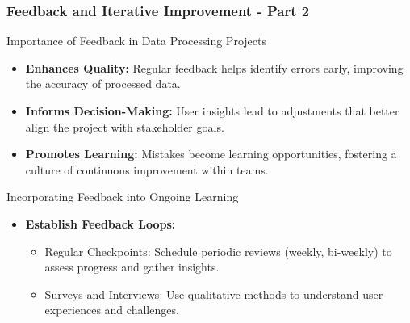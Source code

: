 \documentclass{beamer}
\begin{document}
\begin{frame}[fragile]
    \frametitle{Feedback and Iterative Improvement - Part 2}
    \begin{block}{Importance of Feedback in Data Processing Projects}
        \begin{itemize}
            \item \textbf{Enhances Quality:} Regular feedback helps identify errors early, improving the accuracy of processed data.
            \item \textbf{Informs Decision-Making:} User insights lead to adjustments that better align the project with stakeholder goals.
            \item \textbf{Promotes Learning:} Mistakes become learning opportunities, fostering a culture of continuous improvement within teams.
        \end{itemize}
    \end{block}

    \begin{block}{Incorporating Feedback into Ongoing Learning}
        \begin{itemize}
            \item \textbf{Establish Feedback Loops:}
            \begin{itemize}
                \item Regular Checkpoints: Schedule periodic reviews (weekly, bi-weekly) to assess progress and gather insights.
                \item Surveys and Interviews: Use qualitative methods to understand user experiences and challenges.
            \end{itemize}
        \end{itemize}
    \end{block}
\end{frame}
\end{document}
